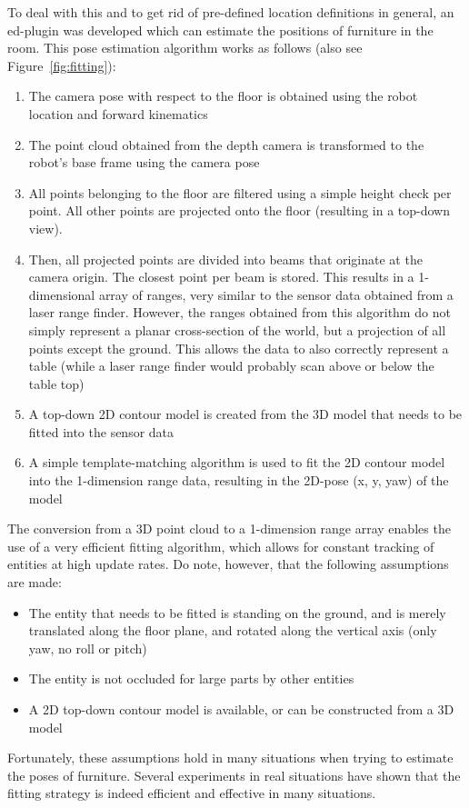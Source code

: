 To deal with this and to get rid of pre-defined location definitions in general, an \gls{ed}-plugin was developed which can estimate the positions of furniture in the room.
This pose estimation algorithm works as follows (also see Figure~\ref{fig:fitting}):

\begin{enumerate}
    \item The camera pose with respect to the floor is obtained using the robot location and forward kinematics
    \item The point cloud obtained from the depth camera is transformed to the robot's base frame using the camera pose
    \item All points belonging to the floor are filtered using a simple height check per point. All other points are projected onto the floor (resulting in a top-down view).
    \item Then, all projected points are divided into beams that originate at the camera origin. The closest point per beam is stored. This results in a 1-dimensional array of ranges, very similar to the sensor data obtained from a laser range finder. However, the ranges obtained from this algorithm do not simply represent a planar cross-section of the world, but a projection of all points except the ground. This allows the data to also correctly represent a table (while a laser range finder would probably scan above or below the table top)
    \item A top-down 2D contour model is created from the 3D model that needs to be fitted into the sensor data
    \item A simple template-matching algorithm is used to fit the 2D contour model into the 1-dimension range data, resulting in the 2D-pose (x, y, yaw) of the model 
\end{enumerate}

The conversion from a 3D point cloud to a 1-dimension range array enables the use of a very efficient fitting algorithm, which allows for constant tracking of entities at high update rates. Do note, however, that the following assumptions are made:

\begin{itemize}
    \item The entity that needs to be fitted is standing on the ground, and is merely translated along the floor plane, and rotated along the vertical axis (only yaw, no roll or pitch)
    \item The entity is not occluded for large parts by other entities
    \item A 2D top-down contour model is available, or can be constructed from a 3D model
\end{itemize}

Fortunately, these assumptions hold in many situations when trying to estimate the poses of furniture. Several experiments in real situations have shown that the fitting strategy is indeed efficient and effective in many situations.